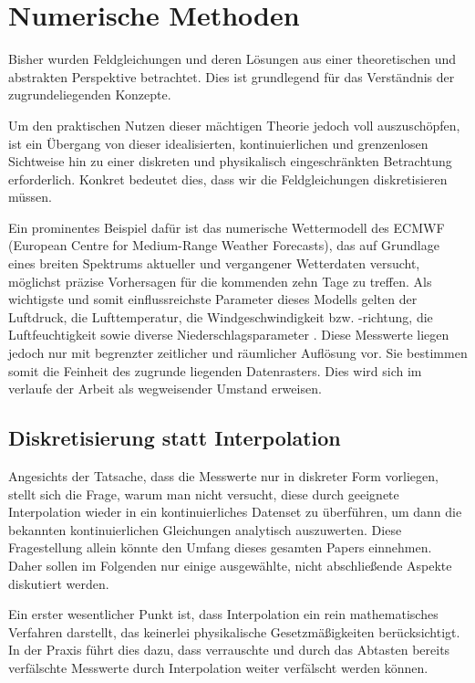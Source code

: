 %
%
%
%
\section{Numerische Methoden}

Bisher wurden Feldgleichungen und deren Lösungen aus einer theoretischen und abstrakten Perspektive betrachtet.
Dies ist grundlegend für das Verständnis der zugrundeliegenden Konzepte.

Um den praktischen Nutzen dieser mächtigen Theorie jedoch voll auszuschöpfen, ist ein Übergang von dieser idealisierten, kontinuierlichen und grenzenlosen Sichtweise hin zu einer diskreten und physikalisch eingeschränkten Betrachtung erforderlich.
Konkret bedeutet dies, dass wir die Feldgleichungen diskretisieren müssen.

Ein prominentes Beispiel dafür ist das numerische Wettermodell des ECMWF (European Centre for Medium-Range Weather Forecasts), das auf Grundlage eines breiten Spektrums aktueller und vergangener Wetterdaten versucht, möglichst präzise Vorhersagen für die kommenden zehn Tage zu treffen.
Als wichtigste und somit einflussreichste Parameter dieses Modells gelten der Luftdruck, die Lufttemperatur, die Windgeschwindigkeit bzw. -richtung, die Luftfeuchtigkeit sowie diverse Niederschlagsparameter \cite{parallelisierung:ecmwf2023}.
Diese Messwerte liegen jedoch nur mit begrenzter zeitlicher und räumlicher Auflösung vor.
Sie bestimmen somit die Feinheit des zugrunde liegenden Datenrasters. Dies wird sich im verlaufe der Arbeit als wegweisender Umstand erweisen.

\subsection{Diskretisierung statt Interpolation}

Angesichts der Tatsache, dass die Messwerte nur in diskreter Form vorliegen, stellt sich die Frage, warum man nicht versucht, diese durch geeignete Interpolation wieder in ein kontinuierliches Datenset zu überführen, um dann die bekannten kontinuierlichen Gleichungen analytisch auszuwerten.
Diese Fragestellung allein könnte den Umfang dieses gesamten Papers einnehmen.
Daher sollen im Folgenden nur einige ausgewählte, nicht abschließende Aspekte diskutiert werden.

Ein erster wesentlicher Punkt ist, dass Interpolation ein rein mathematisches Verfahren darstellt, das keinerlei physikalische Gesetzmäßigkeiten berücksichtigt.
In der Praxis führt dies dazu, dass verrauschte und durch das Abtasten bereits verfälschte Messwerte durch Interpolation weiter verfälscht werden können.


